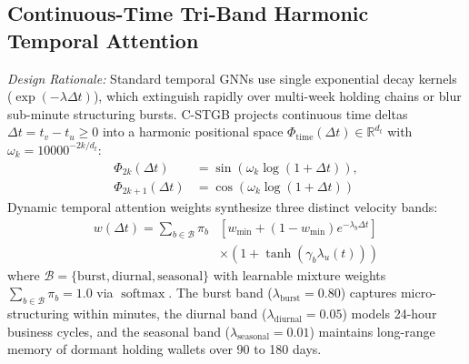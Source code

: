 \subsection{Continuous-Time Tri-Band Harmonic Temporal Attention}
\label{sec:temporal_attention}
\textit{Design Rationale:} Standard temporal GNNs use single exponential decay kernels ($\exp(-\lambda \Delta t)$), which extinguish rapidly over multi-week holding chains or blur sub-minute structuring bursts. C-STGB projects continuous time deltas $\Delta t = t_v - t_u \ge 0$ into a harmonic positional space $\Phi_{\text{time}}(\Delta t) \in \mathbb{R}^{d_t}$ with $\omega_k = 10000^{-2k/d_t}$:
\begin{align}
\Phi_{2k}(\Delta t) &= \sin\left(\omega_k \log(1 + \Delta t)\right), \\
\Phi_{2k+1}(\Delta t) &= \cos\left(\omega_k \log(1 + \Delta t)\right)
\end{align}
Dynamic temporal attention weights synthesize three distinct velocity bands:
\begin{equation}
\begin{split}
w(\Delta t) = \sum_{b \in \mathcal{B}} \pi_b &\left[ w_{\min} + (1 - w_{\min}) e^{-\lambda_b \Delta t} \right] \\
&\times \left( 1 + \tanh(\gamma_b \lambda_u(t)) \right)
\end{split}
\end{equation}
where $\mathcal{B} = \{\text{burst}, \text{diurnal}, \text{seasonal}\}$ with learnable mixture weights $\sum_{b \in \mathcal{B}} \pi_b = 1.0$ via $\operatorname{softmax}$. The burst band ($\lambda_{\text{burst}} = 0.80$) captures micro-structuring within minutes, the diurnal band ($\lambda_{\text{diurnal}} = 0.05$) models 24-hour business cycles, and the seasonal band ($\lambda_{\text{seasonal}} = 0.01$) maintains long-range memory of dormant holding wallets over 90 to 180 days.

